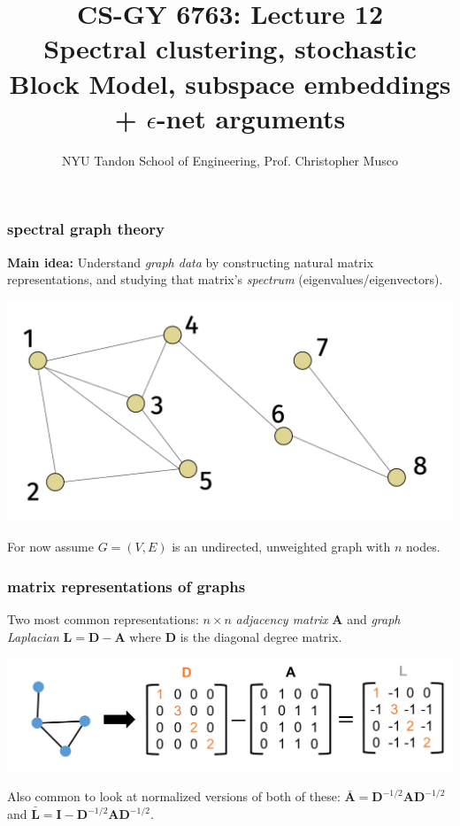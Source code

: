 \documentclass[compress]{beamer}
\title{CS-GY 6763: Lecture 12 \\ Spectral clustering, stochastic Block Model, subspace embeddings + $\epsilon$-net arguments}
\author{NYU Tandon School of Engineering, Prof. Christopher Musco}
\date{}
\newcommand{\bv}[1]{\mathbf{#1}}
\begin{document}
\begin{frame}
	\titlepage 
\end{frame}


\begin{frame}
	\frametitle{spectral graph theory}
	\textbf{Main idea:} Understand \emph{graph data} by constructing natural matrix representations, and studying that matrix's \emph{spectrum} (eigenvalues/eigenvectors).
	\begin{center}
		\includegraphics[width=.8\textwidth]{undirected_graph.png}
		
		For now assume $G = (V,E)$ is an undirected, unweighted graph with $n$ nodes.
	\end{center}
\end{frame}

\begin{frame}
	\frametitle{matrix representations of graphs}
	Two most common representations: $n\times n$ \emph{adjacency matrix} $\bv{A}$ and \emph{graph Laplacian} $\bv{L} = \bv{D}- \bv{A}$ where $\bv{D}$ is the diagonal degree matrix.
	\begin{center}
		\includegraphics[width=\textwidth]{laplace.png}
	\end{center}

	Also common to look at normalized versions of both of these: $\bar{\bv{A}} = \bv{D}^{-1/2}\bv{A}\bv{D}^{-1/2}$ and $\bar{\bv{L}} = \bv{I} - \bv{D}^{-1/2}\bv{A}\bv{D}^{-1/2}$. 
\end{frame}
\end{document}
